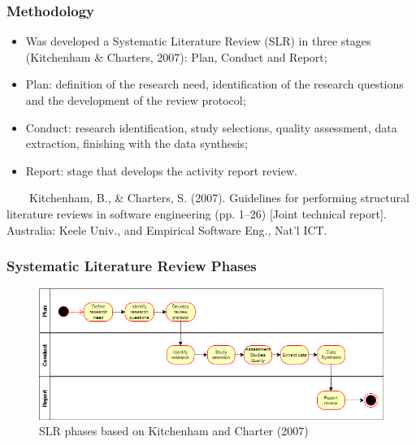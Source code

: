 \documentclass[10pt]{beamer}
\begin{document}

\begin{frame}
	\frametitle{Methodology}
	\begin{itemize}
		\item Was developed a Systematic Literature Review (SLR) in three stages \footnotesize(Kitchenham \& Charters, 2007)\normalsize: Plan, Conduct and Report;
		\item Plan: definition of the research need, identification of the research questions and the development of the review protocol;
		\item Conduct: research identification, study selections, quality assessment, data extraction, finishing with the data synthesis;
		\item Report: stage that develops the activity report review.
	\end{itemize}
	\tiny 
	~~~~Kitchenham, B., \& Charters, S. (2007). Guidelines for performing structural literature reviews in software engineering (pp. 1–26) [Joint technical report]. Australia: Keele Univ., and Empirical Software Eng., Nat’l ICT.\\

\end{frame}

\begin{frame}
	\frametitle{Systematic Literature Review Phases}
	\begin{figure}
		\includegraphics[scale=0.5]{../img/slr_phases.png}
		\caption{SLR phases based on Kitchenham and Charter (2007)}
		\label{figure1}
	\end{figure}
\end{frame}
\end{document}
